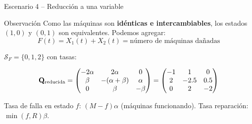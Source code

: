 \documentclass[aspectratio=1610, 9pt]{beamer}
\begin{document}
\begin{frame}{Escenario 4 -- Reducci\'on a una variable}
\begin{block}{Observaci\'on}
Como las m\'aquinas son \textbf{id\'enticas e intercambiables}, los estados $(1,0)$ y $(0,1)$ son equivalentes. Podemos agregar:
\[
F(t) = X_1(t) + X_2(t) = \text{n\'umero de m\'aquinas da\~nadas}
\]
\end{block}

$\mathcal{S}_F = \{0, 1, 2\}$ con tasas:

\centering
{}

\vspace{6pt}
\[
\mathbf{Q}_{\text{reducida}} = \begin{pmatrix}
-2\alpha & 2\alpha & 0 \\
\beta & -(\alpha+\beta) & \alpha \\
0 & \beta & -\beta
\end{pmatrix}
= \begin{pmatrix}
-1 & 1 & 0 \\
2 & -2.5 & 0.5 \\
0 & 2 & -2
\end{pmatrix}
\]

\small Tasa de falla en estado $f$: $(M-f)\alpha$ (m\'aquinas funcionando). Tasa reparaci\'on: $\min(f,R)\beta$.
\end{frame}
\end{document}
